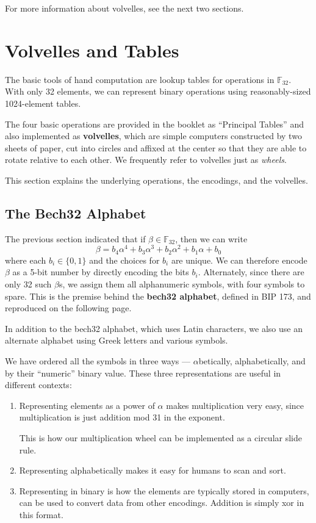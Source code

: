 \documentclass[letterpaper]{article}
\newcommand{\fttwo}{\mathbb{F}_{32}}
\begin{document}
For more information about volvelles, see the next two sections.

\section{Volvelles and Tables}

The basic tools of hand computation are lookup tables for operations in $\fttwo$.
With only 32 elements, we can represent binary operations using reasonably-sized
1024-element tables.

The four basic operations are provided in the booklet as ``Principal Tables''
and also implemented as \textbf{volvelles}, which are simple computers constructed
by two sheets of paper, cut into circles and affixed at the center so that they
are able to rotate relative to each other. We frequently refer to volvelles just
as \emph{wheels}.

This section explains the underlying operations, the encodings, and the volvelles.

\subsection{The Bech32 Alphabet}

The previous section indicated that if $\beta\in\fttwo$, then we can write
\[ \beta = b_4\alpha^4 + b_3\alpha^3 + b_2\alpha^2 + b_1\alpha + b_0 \]
where each $b_i\in\{0, 1\}$ and the choices for $b_i$ are unique.
We can therefore encode $\beta$ as a 5-bit
number by directly encoding the bits $b_i$. Alternately, since there are
only 32 such $\beta$s, we assign them all alphanumeric symbols, with four
symbols to spare. This is the premise behind the \textbf{bech32 alphabet},
defined in BIP 173, and reproduced on the following page.

In addition to the bech32 alphabet, which uses Latin characters, we also use
an alternate alphabet using Greek letters and various symbols.

We have ordered all the symbols in three ways --- $\alpha$betically,
alphabetically, and by their ``numeric'' binary value. These three
representations are useful in different contexts:
\begin{enumerate}
\item Representing elements as a power of $\alpha$ makes multiplication
very easy, since multiplication is just addition mod 31 in the exponent.

This is how our multiplication wheel can be implemented as a circular slide rule.
\item Representing alphabetically makes it easy for humans to scan and sort.
\item Representing in binary is how the elements are typically stored in
computers, can be used to convert data from other encodings. Addition is
simply xor in this format.
\end{enumerate}
\end{document}
